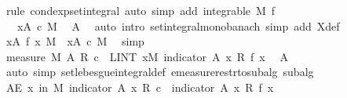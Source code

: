 \begin{isabellebody}
\ {\isacharparenleft}{\kern0pt}rule\ cond{\isacharunderscore}{\kern0pt}exp{\isacharunderscore}{\kern0pt}set{\isacharunderscore}{\kern0pt}integral{\isacharcomma}{\kern0pt}\ auto\ simp\ add{\isacharcolon}{\kern0pt}\ {\isacartoucheopen}integrable\ M\ f{\isacartoucheclose}{\isacharparenright}{\kern0pt}\isanewline
\ \ \ \ \ \ \ \ \isamarkupfalse%
\ \isamarkupfalse%
\ {\isachardoublequoteopen}{\isachardot}{\kern0pt}{\isachardot}{\kern0pt}{\isachardot}{\kern0pt}\ {\isasymle}\ {\isacharparenleft}{\kern0pt}{\isasymintegral}x{\isasymin}A{\isachardot}{\kern0pt}\ c\ {\isasympartial}M{\isacharparenright}{\kern0pt}{\isachardoublequoteclose}\ \isamarkupfalse%
\ A\ \isamarkupfalse%
\ {\isacharparenleft}{\kern0pt}auto\ intro{\isacharbang}{\kern0pt}{\isacharcolon}{\kern0pt}\ set{\isacharunderscore}{\kern0pt}integral{\isacharunderscore}{\kern0pt}mono{\isacharunderscore}{\kern0pt}banach\ simp\ add{\isacharcolon}{\kern0pt}\ X{\isacharunderscore}{\kern0pt}def{\isacharparenright}{\kern0pt}\isanewline
\ \ \ \ \ \ \ \ \isamarkupfalse%
\ \isamarkupfalse%
\ {\isachardoublequoteopen}{\isacharparenleft}{\kern0pt}{\isasymintegral}x{\isasymin}A{\isachardot}{\kern0pt}\ f\ x\ {\isasympartial}M{\isacharparenright}{\kern0pt}\ {\isasymle}\ {\isacharparenleft}{\kern0pt}{\isasymintegral}x{\isasymin}A{\isachardot}{\kern0pt}\ c\ {\isasympartial}M{\isacharparenright}{\kern0pt}{\isachardoublequoteclose}\ \isamarkupfalse%
\ simp\isanewline
\ \ \ \ \ \ \isamarkupfalse%
\isanewline
\ \ \ \ \ \ \isamarkupfalse%
\ \isamarkupfalse%
\ {\isachardoublequoteopen}measure\ M\ A\ {\isacharasterisk}{\kern0pt}\isactrlsub R\ c\ {\isacharequal}{\kern0pt}\ LINT\ x{\isacharbar}{\kern0pt}M{\isachardot}{\kern0pt}\ indicator\ A\ x\ {\isacharasterisk}{\kern0pt}\isactrlsub R\ f\ x{\isachardoublequoteclose}\ \isamarkupfalse%
\ A\ \isamarkupfalse%
\ {\isacharparenleft}{\kern0pt}auto\ simp{\isacharcolon}{\kern0pt}\ set{\isacharunderscore}{\kern0pt}lebesgue{\isacharunderscore}{\kern0pt}integral{\isacharunderscore}{\kern0pt}def\ emeasure{\isacharunderscore}{\kern0pt}restr{\isacharunderscore}{\kern0pt}to{\isacharunderscore}{\kern0pt}subalg\ subalg{\isacharparenright}{\kern0pt}\isanewline
\ \ \ \ \ \ \isamarkupfalse%
\ {\isachardoublequoteopen}AE\ x\ in\ M{\isachardot}{\kern0pt}\ indicator\ A\ x\ {\isacharasterisk}{\kern0pt}\isactrlsub R\ c\ {\isasymle}\ indicator\ A\ x\ {\isacharasterisk}{\kern0pt}\isactrlsub R\ f\ x{\isachardoublequoteclose}\ \isamarkupfalse%

\end{isabellebody}
